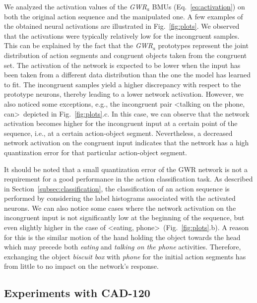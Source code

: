 \documentclass[5p,times]{elsarticle}
\begin{document}
We analyzed the activation values of the \textit{GWR}$_a$ BMUs (Eq.~\ref{eq:activation}) on both the original action sequence and the manipulated one.
A few examples of the obtained neural activations are illustrated in Fig.~\ref{fig:plots}.
We observed that the activations were typically relatively low for the incongruent samples.
This can be explained by the fact that the \textit{GWR}$_a$ prototypes represent the joint distribution of action segments and congruent objects taken from the congruent set.
The activation of the network is expected to be lower when the input has been taken from a different data distribution than the one the model has learned to fit.
The incongruent samples yield a higher discrepancy with respect to the prototype neurons, thereby leading to a lower network activation.
However, we also noticed some exceptions, e.g., the incongruent pair \textless talking on the phone, can\textgreater ~depicted in Fig.~\ref{fig:plots}.c.
In this case, we can observe that the network activation becomes higher for the incongruent input at a certain point of the sequence, i.e., at a certain action-object segment.
Nevertheless, a decreased network activation on the congruent input indicates that the network has a high quantization error for that particular action-object segment.

It should be noted that a small quantization error of the GWR network is not a requirement for a good performance in the action classification task.
As described in Section~\ref{subsec:classification}, the classification of an action sequence is performed by considering the label histograms associated with the activated neurons. 
We can also notice some cases where the network activation on the incongruent input is not significantly low at the beginning of the sequence, but even slightly higher in the case of \textless eating, phone\textgreater ~(Fig.~\ref{fig:plots}.b).  
A reason for this is the similar motion of the hand holding the object towards the head which may precede both \textit{eating} and \textit{talking on the phone} activities. 
Therefore, exchanging the object \textit{biscuit box} with \textit{phone} for the initial action segments has from little to no impact on the network's response. 

\subsection{Experiments with CAD-120}
\end{document}
